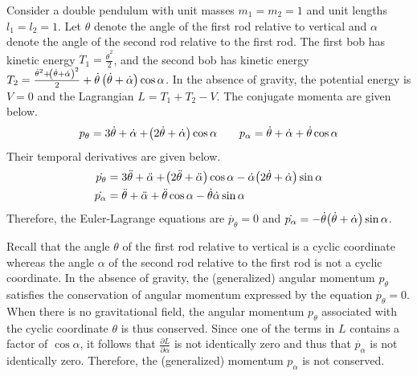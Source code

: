 \begin{answer}
	Consider a double pendulum with unit masses $m_1 = m_2 = 1$ and unit lengths $l_1 = l_2 = 1$.
	Let $\theta$ denote the angle of the first rod relative to vertical and $\alpha$ denote the angle of the second rod relative to the first rod.
	The first bob has kinetic energy $T_1 = \frac{\dot{\theta}^2}{2}$, and the second bob has kinetic energy $T_2 = \frac{\dot{\theta}^2 + \!\left(\dot{\theta} + \dot{\alpha}\right)^2}{2} + \dot{\theta} \left(\dot{\theta} + \dot{\alpha}\right) \cos \alpha$.
	In the absence of gravity, the potential energy is $V = 0$ and the Lagrangian $L = T_1 + T_2 - V$.
	The conjugate momenta are given below.
	\begin{align}
		p_\theta = 3 \dot{\theta} + \dot{\alpha} + \!\left(2 \dot{\theta} + \dot{\alpha}\right) \cos \alpha
		\qquad
		p_\alpha = \dot{\theta} + \dot{\alpha} + \dot{\theta} \cos \alpha
	\end{align}
	Their temporal derivatives are given below.
	\begin{align}
		\dot{p_\theta} & = 3 \ddot{\theta} + \ddot{\alpha} + \!\left(2 \ddot{\theta} + \ddot{\alpha}\right) \cos \alpha - \dot{\alpha} \!\left(2 \dot{\theta} + \dot{\alpha}\right) \sin \alpha \label{eqn:ptheta} \\
		\dot{p_\alpha} & = \ddot{\theta} + \ddot{\alpha} + \ddot{\theta} \cos \alpha - \dot{\theta} \dot{\alpha} \sin \alpha \label{eqn:palpha}
	\end{align}
	Therefore, the Euler-Lagrange equations are $\dot{p_\theta} = 0$ and $\dot{p_\alpha} = -\dot{\theta}\!\left(\dot{\theta} + \dot{\alpha}\right) \sin \alpha$.
\end{answer}

\begin{answer}
	Recall that the angle $\theta$ of the first rod relative to vertical is a cyclic coordinate whereas the angle $\alpha$ of the second rod relative to the first rod is not a cyclic coordinate.
	In the absence of gravity, the (generalized) angular momentum $p_\theta$ satisfies the conservation of angular momentum expressed by the equation $\dot{p_\theta} = 0$.
	When there is no gravitational field, the angular momentum $p_\theta$ associated with the cyclic coordinate $\theta$ is thus conserved.
	Since one of the terms in $L$ contains a factor of $\cos \alpha$, it follows that $\frac{\partial L}{\partial \alpha}$ is not identically zero and thus that $\dot{p_\alpha}$ is not identically zero.
	Therefore, the (generalized) momentum $p_\alpha$ is not conserved.
\end{answer}

